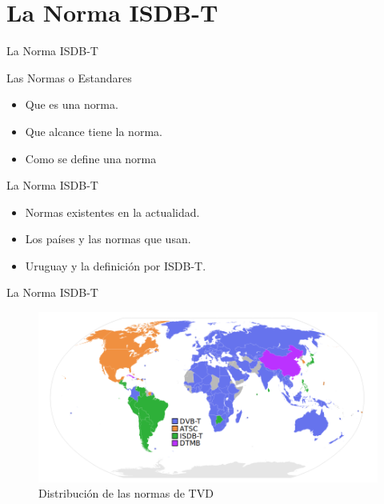 \section{La Norma ISDB-T}
\begin{frame}{La Norma ISDB-T}
	\begin{block}{Las Normas o Estandares}
	\begin{itemize}
		\item {	Que es una norma.}
		\item { Que alcance tiene la norma. }
		\item {	Como se define una norma	}
	\end{itemize}
	\end{block}
	\begin{block}{La Norma ISDB-T}
	\begin{itemize}
		\item {	Normas existentes en la actualidad.}
		\item { Los países y las normas que usan. }
		\item {	Uruguay y la definición por ISDB-T.	}
	\end{itemize}
	\end{block}
\end{frame}

\begin{frame}{La Norma ISDB-T}
\begin{figure}
	\includegraphics[scale=0.35]{Standards}
	\caption{Distribución de las normas de TVD}
\end{figure}

\end{frame}

